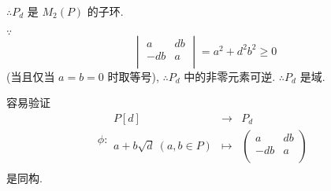 \documentclass[UTF8]{ctexart}
\begin{document}
$\therefore P_d$ 是 $M_2(P)$ 的子环.

$\because$
\[\begin{vmatrix}
    a & db \\
    -db & a \\
\end{vmatrix}=a^2+d^2b^2\geq0\]
(当且仅当 $a=b=0$ 时取等号), $\therefore P_d$ 中的非零元素可逆. $\therefore P_d$ 是域.

容易验证%
\[\phi:\begin{array}{rcl}
    P[d] & \to & P_d \\
    a+b\sqrt{d}\ (a,b\in P) & \mapsto & \begin{pmatrix}
        a & db \\
        -db & a \\
    \end{pmatrix} \\
\end{array}\]
是同构.
\end{document}
